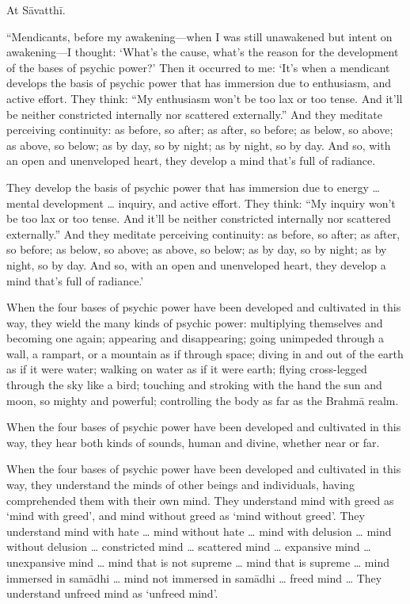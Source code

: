\documentclass[12pt,openany]{book}%
\begin{document}
At \textsanskrit{Sāvatthī}. 

“Mendicants, before my awakening—when I was still unawakened but intent on awakening—I thought: ‘What’s the cause, what’s the reason for the development of the bases of psychic power?’ Then it occurred to me: ‘It’s when a mendicant develops the basis of psychic power that has immersion due to enthusiasm, and active effort. They think: “My enthusiasm won’t be too lax or too tense. And it’ll be neither constricted internally nor scattered externally.” And they meditate perceiving continuity: as before, so after; as after, so before; as below, so above; as above, so below; as by day, so by night; as by night, so by day. And so, with an open and unenveloped heart, they develop a mind that’s full of radiance. 

They develop the basis of psychic power that has immersion due to energy … mental development … inquiry, and active effort. They think: “My inquiry won’t be too lax or too tense. And it’ll be neither constricted internally nor scattered externally.” And they meditate perceiving continuity: as before, so after; as after, so before; as below, so above; as above, so below; as by day, so by night; as by night, so by day. And so, with an open and unenveloped heart, they develop a mind that’s full of radiance.’ 

When the four bases of psychic power have been developed and cultivated in this way, they wield the many kinds of psychic power: multiplying themselves and becoming one again; appearing and disappearing; going unimpeded through a wall, a rampart, or a mountain as if through space; diving in and out of the earth as if it were water; walking on water as if it were earth; flying cross-legged through the sky like a bird; touching and stroking with the hand the sun and moon, so mighty and powerful; controlling the body as far as the \textsanskrit{Brahmā} realm. 

When the four bases of psychic power have been developed and cultivated in this way, they hear both kinds of sounds, human and divine, whether near or far. 

When the four bases of psychic power have been developed and cultivated in this way, they understand the minds of other beings and individuals, having comprehended them with their own mind. They understand mind with greed as ‘mind with greed’, and mind without greed as ‘mind without greed’. They understand mind with hate … mind without hate … mind with delusion … mind without delusion … constricted mind … scattered mind … expansive mind … unexpansive mind … mind that is not supreme … mind that is supreme … mind immersed in \textsanskrit{samādhi} … mind not immersed in \textsanskrit{samādhi} … freed mind … They understand unfreed mind as ‘unfreed mind’. 
\end{document}
